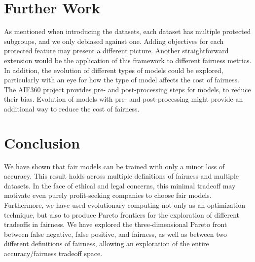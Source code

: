 \documentclass[twoside]{article}
\begin{document}
\section{Further Work}
As mentioned when introducing the datasets, each dataset has multiple protected subgroups, and we only debiased against one. Adding objectives for each protected feature may present a different picture. Another straightforward extension would be the application of this framework to different fairness metrics. In addition, the evolution of different types of models could be explored, particularly with an eye for how the type of model affects the cost of fairness. The AIF360 project provides pre- and post-processing steps for models, to reduce their bias. Evolution of models with pre- and post-processing might provide an additional way to reduce the cost of fairness.

\section{Conclusion}
We have shown that fair models can be trained with only a minor loss of accuracy. This result holds across multiple definitions of fairness and multiple datasets. In the face of ethical and legal concerns, this minimal tradeoff may motivate even purely profit-seeking companies to choose fair models. Furthermore, we have used evolutionary computing not only as an optimization technique, but also to produce Pareto frontiers for the exploration of different tradeoffs in fairness. We have explored the three-dimensional Pareto front between false negative, false positive, and fairness, as well as between two different definitions of fairness, allowing an exploration of the entire accuracy/fairness tradeoff space.
 




\end{document}
